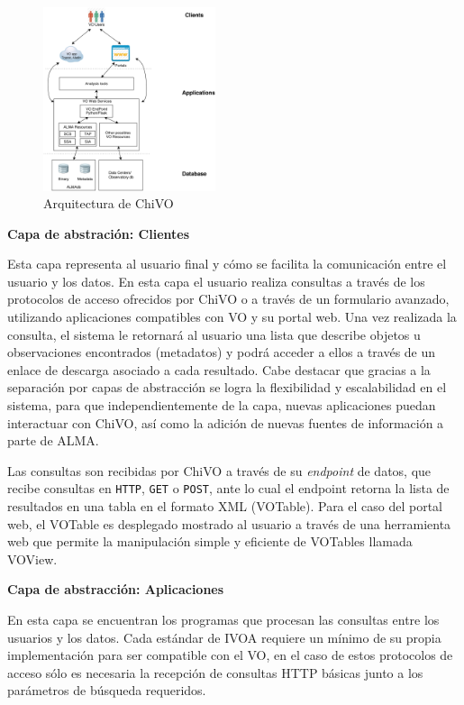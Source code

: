 \begin{figure}[ht]
    \centering
    \includegraphics[width=0.45\textwidth]{images/chivo_capas.png}
    \caption{Arquitectura de ChiVO}
    \label{fig:chivoarch}
\end{figure}

\textbf{Capa de abstración: Clientes}

Esta capa representa al usuario final y cómo se facilita la comunicación entre el
usuario y los datos.
En esta capa el usuario realiza consultas a través de los protocolos de acceso
ofrecidos por ChiVO o a través de un formulario avanzado, utilizando aplicaciones
compatibles con VO y su portal web.
Una vez realizada la consulta, el sistema le retornará al usuario una lista que
describe objetos u observaciones encontrados (metadatos) y podrá acceder a ellos a
través de un enlace de descarga asociado a cada resultado.
Cabe destacar que gracias a la separación por capas de abstracción se logra la
flexibilidad y escalabilidad en el sistema, para que independientemente de la capa,
nuevas aplicaciones puedan interactuar con ChiVO, así como la adición de nuevas
fuentes de información a parte de ALMA.

Las consultas son recibidas por ChiVO a través de su \emph{endpoint} de datos, que
recibe consultas en \texttt{HTTP}, \texttt{GET} o \texttt{POST}, ante lo cual el
endpoint retorna la lista de resultados en una tabla en el formato XML (VOTable).
Para el caso del portal web, el VOTable es desplegado mostrado al usuario a través
de una herramienta web que permite la manipulación simple y eficiente de VOTables
llamada VOView.

\textbf{Capa de abstracción: Aplicaciones}

En esta capa se encuentran los programas que procesan las consultas entre los
usuarios y los datos.
Cada estándar de IVOA requiere un mínimo de su propia implementación para ser
compatible con el VO, en el caso de estos protocolos de acceso sólo es necesaria la
recepción de consultas HTTP básicas junto a los parámetros de búsqueda requeridos.

